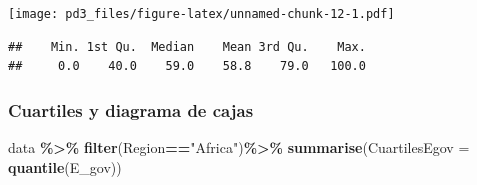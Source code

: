 \documentclass[
]{article}
\newenvironment{Shaded}{\begin{snugshade}}{\end{snugshade}}
\newcommand{\AttributeTok}[1]{\textcolor[rgb]{0.13,0.29,0.53}{#1}}
\newcommand{\DecValTok}[1]{\textcolor[rgb]{0.00,0.00,0.81}{#1}}
\newcommand{\FloatTok}[1]{\textcolor[rgb]{0.00,0.00,0.81}{#1}}
\newcommand{\FunctionTok}[1]{\textcolor[rgb]{0.13,0.29,0.53}{\textbf{#1}}}
\newcommand{\NormalTok}[1]{#1}
\newcommand{\SpecialCharTok}[1]{\textcolor[rgb]{0.81,0.36,0.00}{\textbf{#1}}}
\newcommand{\StringTok}[1]{\textcolor[rgb]{0.31,0.60,0.02}{#1}}
\begin{document}
\begin{Shaded}
\end{Shaded}

\texttt{[image: pd3\_files/figure-latex/unnamed-chunk-12-1.pdf]}

\begin{Shaded}
\end{Shaded}

\begin{verbatim}
##    Min. 1st Qu.  Median    Mean 3rd Qu.    Max. 
##     0.0    40.0    59.0    58.8    79.0   100.0
\end{verbatim}

\hypertarget{cuartiles-y-diagrama-de-cajas}{%
\subsubsection{Cuartiles y diagrama de
cajas}\label{cuartiles-y-diagrama-de-cajas}}

\begin{Shaded}
\begin{Highlighting}[]
\NormalTok{data }\SpecialCharTok{\%\textgreater{}\%} 
  \FunctionTok{filter}\NormalTok{(Region}\SpecialCharTok{==}\StringTok{"Africa"}\NormalTok{)}\SpecialCharTok{\%\textgreater{}\%} 
  \FunctionTok{summarise}\NormalTok{(}\AttributeTok{CuartilesEgov =} \FunctionTok{quantile}\NormalTok{(E\_gov))}
\end{Highlighting}
\end{Shaded}
\end{document}
